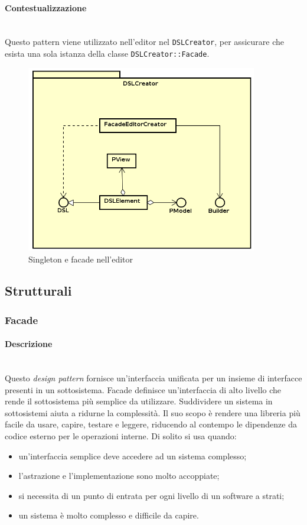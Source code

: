 \paragraph{Contestualizzazione}\mbox{} \\
Questo pattern viene utilizzato nell'editor nel  \texttt{DSLCreator}, per assicurare che esista una sola istanza della classe \texttt{DSLCreator::Facade}.
\begin{figure}[H]
\centering
\includegraphics[width=0.9\textwidth]{res/sections/frontend/facade_editor.png}
\caption{Singleton e facade nell'editor}
\label{fig:singleton_editor}
\end{figure}
\subsection{Strutturali}
\subsubsection{Facade}
\paragraph{Descrizione} \mbox{} \\
Questo \textit{design pattern} fornisce un'interfaccia unificata per un insieme di interfacce presenti in un sottosistema. Facade definisce un'interfaccia di alto livello che rende il sottosistema più semplice da utilizzare. Suddividere un sistema in sottosistemi aiuta a ridurne la complessità. Il suo scopo è rendere una libreria più facile da usare, capire, testare e leggere, riducendo al contempo le dipendenze da codice esterno per le operazioni interne. Di solito si usa quando:
\begin{itemize}
\item un'interfaccia semplice deve accedere ad un sistema complesso;
\item l'astrazione e l'implementazione sono molto accoppiate;
\item si necessita di un punto di entrata per ogni livello di un software a strati;
\item un sistema è molto complesso e difficile da capire.
\end{itemize}
